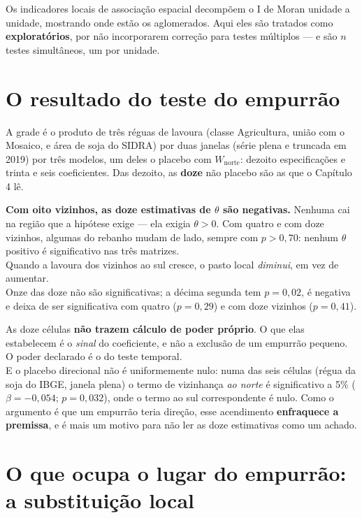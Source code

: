 Os indicadores locais de associação espacial decompõem o I de Moran unidade a
unidade, mostrando onde estão os aglomerados. Aqui eles são tratados como
\textbf{exploratórios}, por não incorporarem correção para testes múltiplos ---
e são $n$ testes simultâneos, um por unidade.

\section{O resultado do teste do empurrão}

A grade é o produto de três réguas de lavoura (classe Agricultura, união com o
Mosaico, e área de soja do SIDRA) por duas janelas (série plena e truncada em
2019) por três modelos, um deles o placebo com $W_{\mathrm{norte}}$: dezoito
especificações e trinta e seis coeficientes. Das dezoito, as \textbf{doze} não
placebo são as que o Capítulo 4 lê.

\begin{ancora}
\textbf{Com oito vizinhos, as doze estimativas de $\theta$ são negativas.}
Nenhuma cai na região que a hipótese exige --- ela exigia $\theta > 0$. Com
quatro e com doze vizinhos, algumas do rebanho mudam de lado, sempre com
$p > 0{,}70$: nenhum $\theta$ positivo é significativo nas três matrizes. \\
Quando a lavoura dos vizinhos ao sul cresce, o pasto local \emph{diminui}, em
vez de aumentar. \\
Onze das doze não são significativas; a décima segunda tem $p = 0{,}02$, é
negativa e deixa de ser significativa com quatro ($p = 0{,}29$) e com doze
vizinhos ($p = 0{,}41$).
\end{ancora}

\begin{naodiz}
As doze células \textbf{não trazem cálculo de poder próprio}. O que elas
estabelecem é o \emph{sinal} do coeficiente, e não a exclusão de um empurrão
pequeno. O poder declarado é o do teste temporal. \\[4pt]
E o placebo direcional não é uniformemente nulo: numa das seis células (régua
da soja do IBGE, janela plena) o termo de vizinhança \emph{ao norte} é
significativo a 5\% ($\beta = -0{,}054$; $p = 0{,}032$), onde o termo ao sul
correspondente é nulo. Como o argumento é que um empurrão teria direção, esse
acendimento \textbf{enfraquece a premissa}, e é mais um motivo para não ler
as doze estimativas como um achado.
\end{naodiz}

\section{O que ocupa o lugar do empurrão: a substituição local}

